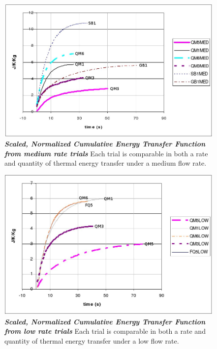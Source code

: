 \begin{landscape}
\begin{figure}
\vspace{4mm}
 \centering\includegraphics[scale=0.7]{med1.JPG}
 \caption[Scaled, Normalized CET - Medium Flow]{\textbf{\emph{Scaled, Normalized Cumulative Energy Transfer Function from medium rate trials}} Each trial is comparable in both a rate and quantity of thermal energy transfer under a medium flow rate.\label{med1}}
\end{figure}
\end{landscape}
\begin{landscape}
\begin{figure}
\vspace{4mm}
 \centering\includegraphics[scale=0.7]{low1.jpg}
 \caption[Scaled, Normalized CET - Low Flow]{\textbf{\emph{Scaled, Normalized Cumulative Energy Transfer Function from low rate trials}} Each trial is comparable in both a rate and quantity of thermal energy transfer under a low flow rate.\label{low1}}
\end{figure}
\end{landscape}
